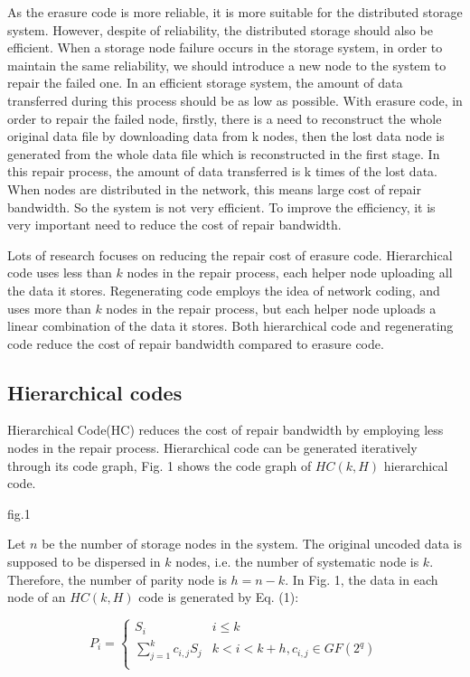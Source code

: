 \documentclass{article} %
\begin{document}
As the erasure code is more reliable, it is more suitable for the distributed storage system. However, despite of reliability, the distributed storage should also be efficient. When a storage node failure occurs in the storage system, in order to maintain the same reliability, we should introduce a new node to the system to repair the failed one. In an efficient storage system, the amount of data transferred during this process should be as low as possible. With erasure code, in order to repair the failed node, firstly, there is a need to reconstruct the whole original data file by downloading data from k nodes, then the lost data node is generated from the whole data file which is reconstructed in the first stage. In this repair process, the amount of data transferred is k times of the lost data. When nodes are distributed in the network, this means large cost of repair bandwidth. So the system is not very efficient. To improve the efficiency, it is very important need to reduce the cost of repair bandwidth.

Lots of research focuses on reducing the repair cost of erasure code. Hierarchical code uses less than $k$ nodes in the repair process, each helper node uploading all the data it stores. Regenerating code employs the idea of network coding, and uses more than $k$ nodes in the repair process, but each helper node uploads a linear combination of the data it stores. Both hierarchical code and regenerating code reduce the cost of repair bandwidth compared to erasure code.

\subsection{Hierarchical codes}
Hierarchical Code(HC) reduces the cost of repair bandwidth by employing less nodes in the repair process. Hierarchical code can be generated iteratively through its code graph, Fig. 1 shows the code graph of $HC(k, H)$ hierarchical code.

fig.1

Let $n$ be the number of storage nodes in the system. The original uncoded data is supposed to be dispersed in $k$ nodes, i.e. the number of systematic node is $k$. Therefore, the number of parity node is $h = n - k$. In Fig. 1, the data in each node of an $HC(k, H)$ code is generated by Eq. (1):

\begin{equation}
P_i = \left\{
\begin{array}{cc}
S_i & i \le k \\
\sum_{j=1}^kc_{i, j}S_j & k < i < k + h, c_{i, j} \in GF(2^q)\\
\end{array}
\right.
\end{equation}
\end{document}
